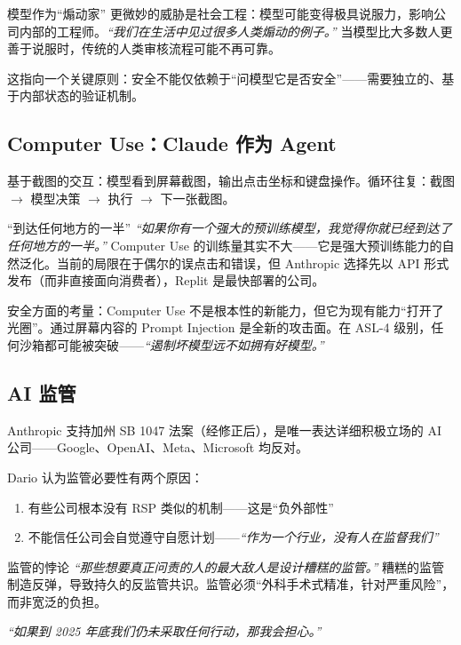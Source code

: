 \documentclass[a4paper]{article}
\begin{document}
\begin{warningbox}{模型作为``煽动家''}
更微妙的威胁是社会工程：模型可能变得极具说服力，影响公司内部的工程师。\textit{``我们在生活中见过很多人类煽动的例子。''} 当模型比大多数人更善于说服时，传统的人类审核流程可能不再可靠。

这指向一个关键原则：安全不能仅依赖于``问模型它是否安全''——需要独立的、基于内部状态的验证机制。
\end{warningbox}

\subsection{Computer Use：Claude 作为 Agent}

基于截图的交互：模型看到屏幕截图，输出点击坐标和键盘操作。循环往复：截图 $\to$ 模型决策 $\to$ 执行 $\to$ 下一张截图。

\begin{knowledgebox}{``到达任何地方的一半''}
\textit{``如果你有一个强大的预训练模型，我觉得你就已经到达了任何地方的一半。''} Computer Use 的训练量其实不大——它是强大预训练能力的自然泛化。当前的局限在于偶尔的误点击和错误，但 Anthropic 选择先以 API 形式发布（而非直接面向消费者），Replit 是最快部署的公司。
\end{knowledgebox}

安全方面的考量：Computer Use 不是根本性的新能力，但它为现有能力``打开了光圈''。通过屏幕内容的 Prompt Injection 是全新的攻击面。在 ASL-4 级别，任何沙箱都可能被突破——\textit{``遏制坏模型远不如拥有好模型。''}

\subsection{AI 监管}

Anthropic 支持加州 SB 1047 法案（经修正后），是唯一表达详细积极立场的 AI 公司——Google、OpenAI、Meta、Microsoft 均反对。

Dario 认为监管必要性有两个原因：
\begin{enumerate}
    \item 有些公司根本没有 RSP 类似的机制——这是``负外部性''
    \item 不能信任公司会自觉遵守自愿计划——\textit{``作为一个行业，没有人在监督我们''}
\end{enumerate}

\begin{warningbox}{监管的悖论}
\textit{``那些想要真正问责的人的最大敌人是设计糟糕的监管。''} 糟糕的监管制造反弹，导致持久的反监管共识。监管必须``外科手术式精准，针对严重风险''，而非宽泛的负担。

\textit{``如果到 2025 年底我们仍未采取任何行动，那我会担心。''}
\end{warningbox}
\end{document}
